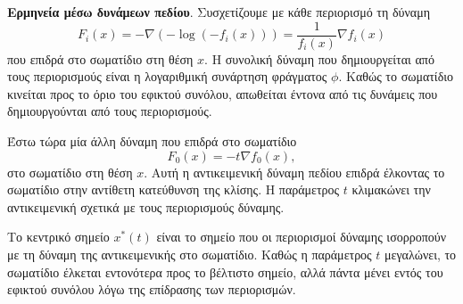 \textbf{Ερμηνεία μέσω δυνάμεων πεδίου}. Συσχετίζουμε με κάθε περιορισμό τη
δύναμη
\begin{equation*}
    F_i(x) = - \nabla (- \log{(-f_i(x))}) = \dfrac{1}{f_i(x)} \nabla f_i(x)
\end{equation*}
που επιδρά στο σωματίδιο στη θέση \( x \). Η συνολική δύναμη που
δημιουργείται από τους περιορισμούς είναι η λογαριθμική συνάρτηση φράγματος
\(\phi \). Καθώς το σωματίδιο κινείται προς το όριο του εφικτού συνόλου,
απωθείται έντονα από τις δυνάμεις που δημιουργούνται από τους περιορισμούς.

Έστω τώρα μία άλλη δύναμη που επιδρά στο σωματίδιο
\begin{equation*}
    F_0(x) = - t\nabla f_0(x),
\end{equation*}
στο σωματίδιο στη θέση \( x \). Αυτή η αντικειμενική δύναμη πεδίου επιδρά
έλκοντας το σωματίδιο στην αντίθετη κατεύθυνση της κλίσης. Η παράμετρος
\( t \) κλιμακώνει την αντικειμενική σχετικά με τους περιορισμούς δύναμης.

Το κεντρικό σημείο \( x^*(t) \) είναι το σημείο που οι περιορισμοί δύναμης
ισορροπούν με τη δύναμη της αντικειμενικής στο σωματίδιο. Καθώς η παράμετρος
\( t \)  μεγαλώνει, το σωματίδιο έλκεται εντονότερα προς το βέλτιστο σημείο,
αλλά πάντα μένει εντός του εφικτού συνόλου λόγω της επίδρασης των περιορισμών.

